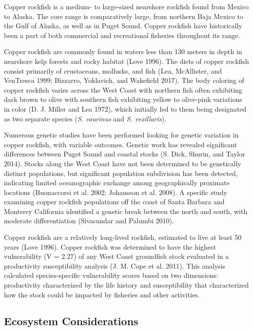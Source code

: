 \documentclass[11pt,
  english,
  letterpaper,
]{article}
\begin{document}
Copper rockfish is a medium- to large-sized nearshore rockfish found from Mexico to Alaska. The core range is comparatively large, from northern Baja Mexico to the Gulf of Alaska, as well as in Puget Sound. Copper rockfish have historically been a part of both commercial and recreational fisheries throughout its range.

Copper rockfish are commonly found in waters less than 130 meters in depth in nearshore kelp forests and rocky habitat (Love 1996). The diets of copper rockfish consist primarily of crustaceans, mollusks, and fish (Lea, McAllister, and VenTresca 1999; Bizzarro, Yoklavich, and Wakefield 2017). The body coloring of copper rockfish varies across the West Coast with northern fish often exhibiting dark brown to olive with southern fish exhibiting yellow to olive-pink variations in color (D. J. Miller and Lea 1972), which initially led to them being designated as two separate species (\emph{S. caurinus} and \emph{S. vexillaris}).

Numerous genetic studies have been performed looking for genetic variation in copper rockfish, with variable outcomes. Genetic work has revealed significant differences between Puget Sound and coastal stocks (S. Dick, Shurin, and Taylor 2014). Stocks along the West Coast have not been determined to be genetically distinct populations, but significant population subdivision has been detected, indicating limited oceanographic exchange among geographically proximate locations (Buonaccorsi et al. 2002; Johansson et al. 2008). A specific study examining copper rockfish populations off the coast of Santa Barbara and Monterey California identified a genetic break between the north and south, with moderate differentiation (Sivasundar and Palumbi 2010).

Copper rockfish are a relatively long-lived rockfish, estimated to live at least 50 years (Love 1996). Copper rockfish was determined to have the highest vulnerability (V = 2.27) of any West Coast groundfish stock evaluated in a productivity susceptibility analysis (J. M. Cope et al. 2011). This analysis calculated species-specific vulnerability scores based on two dimensions: productivity characterized by the life history and susceptibility that characterized how the stock could be impacted by fisheries and other activities.

\hypertarget{ecosystem-considerations-1}{%
\subsection{Ecosystem Considerations}\label{ecosystem-considerations-1}}
\end{document}
